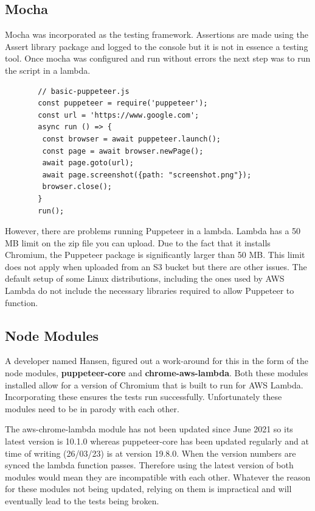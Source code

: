\documentclass[12pt,a4paper,titlepage]{report}
\begin{document}
\subsection{Mocha}

Mocha was incorporated as the testing framework. Assertions are made using the Assert library package and logged to the console but it is not in essence a testing tool.
Once mocha was configured and run without errors the next step was to run the script in a lambda.

\begin{figure}[H]
 \begin{tcolorbox}
  \begin{verbatim}
  // basic-puppeteer.js
  const puppeteer = require('puppeteer');
  const url = 'https://www.google.com';
  async run () => {
   const browser = await puppeteer.launch();
   const page = await browser.newPage();
   await page.goto(url);
   await page.screenshot({path: "screenshot.png"});
   browser.close();
  }
  run();
\end{verbatim}
\end{tcolorbox}
\end{figure}

However, there are problems running Puppeteer in a lambda. Lambda has a 50 MB limit on the zip file you can upload. 
Due to the fact that it installs Chromium, the Puppeteer package is significantly larger than 50 {MB}. This 
limit does not apply when uploaded from an S3 bucket but there are other issues. 
The default setup of some Linux distributions, including the ones used by AWS Lambda do not include the necessary libraries required to allow Puppeteer to function.

\subsection{Node Modules}

A developer named Hansen\autocite{Hansen}, figured out a work-around for this in the form of the node modules, \textbf{puppeteer-core} and \textbf{chrome-aws-lambda}.
Both these modules installed allow for a version of Chromium that is built to run for AWS Lambda. Incorporating
these ensures the tests run successfully. Unfortunately these modules need to be in parody with each other.

The aws-chrome-lambda module has not been updated since June 2021 so its latest version is 10.1.0 whereas
puppeteer-core has been updated regularly and at time of writing (26/03/23) is at version 19.8.0. When the version numbers are
synced the lambda function passes. Therefore using the latest version of both modules would mean they are incompatible with each other.
Whatever the reason for these modules not being updated, relying on them is impractical and will eventually lead to the tests being broken.
\end{document}
